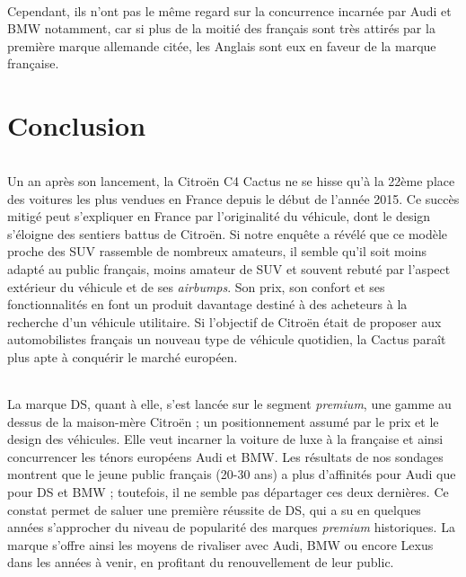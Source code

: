 \documentclass[12pt]{article}\usepackage[]{graphicx}\usepackage[]{color}
\begin{document}
\paragraph{} Cependant, ils n'ont pas le même regard sur la concurrence
incarnée par Audi et BMW notamment, car si plus de la moitié des français sont
très attirés par la première marque allemande citée, les Anglais sont eux en
faveur de la marque française.

\paragraph{}

\part{Conclusion}

\paragraph{} Un an après son lancement, la Citroën C4 Cactus ne se hisse qu'à la 22ème place des voitures les plus vendues en France depuis le début de l’année 2015. Ce succès mitigé peut s'expliquer en France par l'originalité du véhicule, dont le design s'éloigne des sentiers battus de Citroën. Si notre enquête a révélé que ce modèle proche des SUV rassemble de nombreux amateurs, il semble qu'il soit moins adapté au public français, moins amateur de SUV et souvent rebuté par l'aspect extérieur du véhicule et de ses \textit{airbumps}. Son prix, son confort et ses fonctionnalités en font un produit davantage destiné à des acheteurs à la recherche d'un véhicule utilitaire. Si l'objectif de Citroën était de proposer aux automobilistes français un nouveau type de véhicule quotidien, la Cactus paraît plus apte à conquérir le marché européen.


\paragraph{} La marque DS, quant à elle, s’est lancée sur le segment \textit{premium}, une gamme au dessus de la maison-mère Citroën ; un positionnement assumé par le prix et le design des véhicules. Elle veut incarner la voiture de luxe à la française et ainsi concurrencer les ténors européens Audi et BMW. Les résultats de nos sondages montrent que le jeune public français (20-30 ans) a plus d'affinités pour Audi que pour DS et BMW ; toutefois, il ne semble pas départager ces deux dernières. Ce constat permet de saluer une première réussite de DS, qui a su en quelques années s'approcher du niveau de popularité des marques \textit{premium} historiques. La marque s'offre ainsi les moyens de rivaliser avec Audi, BMW ou encore Lexus dans les années à venir, en profitant du renouvellement de leur public.
\end{document}
